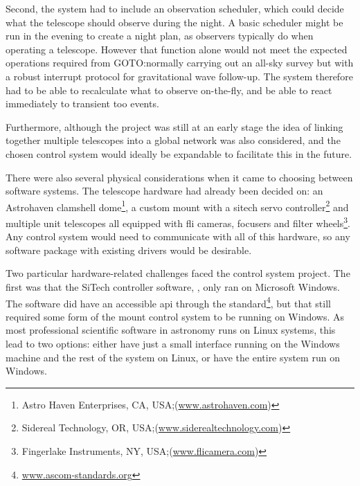 \begin{colsection}
\begin{colsection}
Second, the system had to include an observation scheduler, which could decide what the telescope should observe during the night. A basic scheduler might be run in the evening to create a night plan, as observers typically do when operating a telescope. However that function alone would not meet the expected operations required from GOTO:\@ normally carrying out an all-sky survey but with a robust interrupt protocol for gravitational wave follow-up. The system therefore had to be able to recalculate what to observe on-the-fly, and be able to react immediately to transient \gls{too} events.

Furthermore, although the project was still at an early stage the idea of linking together multiple telescopes into a global network was also considered, and the chosen control system would ideally be expandable to facilitate this in the future.

There were also several physical considerations when it came to choosing between software systems. The telescope hardware had already been decided on: an Astrohaven clamshell dome\footnote{Astro Haven Enterprises, CA, USA;\@ (\url{www.astrohaven.com})}, a custom mount with a \gls{sitech} servo controller\footnote{Sidereal Technology, OR, USA;\@ (\url{www.siderealtechnology.com})} and multiple unit telescopes all equipped with \gls{fli} cameras, focusers and filter wheels\footnote{Fingerlake Instruments, NY, USA;\@ (\url{www.flicamera.com})}. Any control system would need to communicate with all of this hardware, so any software package with existing drivers would be desirable. 

Two particular hardware-related challenges faced the control system project. The first was that the SiTech controller software, , only ran on Microsoft Windows. The software did have an accessible \gls{api} through the  standard\footnote{\url{www.ascom-standards.org}}, but that still required some form of the mount control system to be running on Windows. As most professional scientific software in astronomy runs on Linux systems, this lead to two options: either have just a small interface running on the Windows machine and the rest of the system on Linux, or have the entire system run on Windows.


\end{colsection}
\end{colsection}
